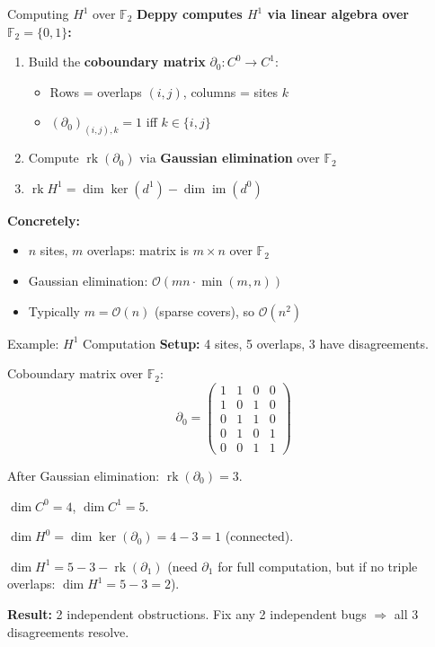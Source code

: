 \documentclass[aspectratio=169,10pt]{beamer}
\newcommand{\im}{\operatorname{im}}
\newcommand{\rk}{\operatorname{rk}}
\begin{document}
\begin{frame}{Computing $H^1$ over $\mathbb{F}_2$}
\textbf{Deppy computes $H^1$ via linear algebra over $\mathbb{F}_2 = \{0, 1\}$:}

\begin{enumerate}
  \item Build the \textbf{coboundary matrix} $\partial_0 : C^0 \to C^1$:
  \begin{itemize}
    \item Rows = overlaps $(i, j)$, columns = sites $k$
    \item $(\partial_0)_{(i,j),k} = 1$ iff $k \in \{i, j\}$
  \end{itemize}
  \item Compute $\rk(\partial_0)$ via \textbf{Gaussian elimination} over $\mathbb{F}_2$
  \item $\rk H^1 = \dim\ker(d^1) - \dim\im(d^0)$
\end{enumerate}

\vspace{0.3em}
\textbf{Concretely:}
\begin{itemize}
  \item $n$ sites, $m$ overlaps: matrix is $m \times n$ over $\mathbb{F}_2$
  \item Gaussian elimination: $\mathcal{O}(mn \cdot \min(m,n))$
  \item Typically $m = \mathcal{O}(n)$ (sparse covers), so $\mathcal{O}(n^2)$
\end{itemize}
\end{frame}

\begin{frame}{Example: $H^1$ Computation}
\textbf{Setup:} 4 sites, 5 overlaps, 3 have disagreements.

Coboundary matrix over $\mathbb{F}_2$:
\[
\partial_0 = \begin{pmatrix}
1 & 1 & 0 & 0 \\
1 & 0 & 1 & 0 \\
0 & 1 & 1 & 0 \\
0 & 1 & 0 & 1 \\
0 & 0 & 1 & 1
\end{pmatrix}
\]

After Gaussian elimination: $\rk(\partial_0) = 3$.

$\dim C^0 = 4$, $\dim C^1 = 5$.

$\dim H^0 = \dim\ker(\partial_0) = 4 - 3 = 1$ (connected).

$\dim H^1 = 5 - 3 - \rk(\partial_1)$ (need $\partial_1$ for full computation, but if no triple overlaps: $\dim H^1 = 5 - 3 = 2$).

\textbf{Result:} 2 independent obstructions. Fix any 2 independent bugs $\Rightarrow$ all 3 disagreements resolve.
\end{frame}
\end{document}
